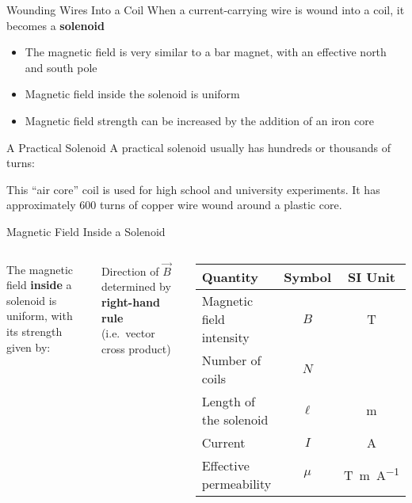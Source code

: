 \documentclass[12pt,aspectratio=169]{beamer}
\begin{document}
\begin{frame}{Wounding Wires Into a Coil}
   When a current-carrying wire is wound into a coil, it becomes a
  \textbf{solenoid}
  \begin{itemize}
  \item The magnetic field is very similar to a bar magnet, with an effective
    north and south pole
  \item Magnetic field inside the solenoid is uniform
  \item Magnetic field strength can be increased by the addition of an iron core
  \end{itemize}
  \begin{center}
  \end{center}
\end{frame}



\begin{frame}{A Practical Solenoid}
  A practical solenoid usually has hundreds or thousands of turns:
  \begin{center}
  \end{center}

  \vspace{-.2in}
  This ``air core'' coil is used for high school and university experiments. It
  has approximately 600 turns of copper wire wound around a plastic core.
\end{frame}



\begin{frame}{Magnetic Field Inside a Solenoid}
  \begin{columns}
    
    The magnetic field \textbf{inside} a solenoid is uniform, with its strength
    given by:
    
    
    Direction of $\vec B$ determined by \textbf{right-hand rule} (i.e.\ vector
    cross product)
    \begin{center}
      \begin{tabular}{l|c|c}
        \rowcolor{pink}
        \textbf{Quantity} & \textbf{Symbol} & \textbf{SI Unit} \\ \hline
        Magnetic field intensity & $B$    & \si\tesla \\
        Number of coils          & $N$    & \\
        Length of the solenoid   & $\ell$ & \si\metre \\
        Current                  & $I$    & \si\ampere \\
        Effective permeability   & $\mu$  & \si{\tesla.\metre\per\ampere}
      \end{tabular}
    \end{center}
  \end{columns}
\end{frame}
\end{document}
